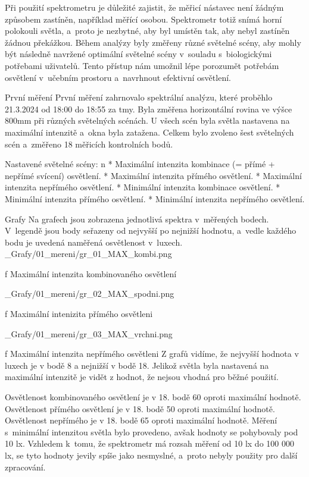 Při použití spektrometru je důležité zajistit, že měřicí nástavec není žádným způsobem zastíněn,
například měřící osobou. Spektrometr totiž snímá horní polokouli světla, a~proto je nezbytné, aby byl umístěn tak, aby nebyl zastíněn žádnou překážkou.
\medskip
Během analýzy byly změřeny různé světelné scény, aby mohly být následně navržené optimální světelné scény
v~souladu s~biologickými potřebami uživatelů. Tento přístup nám umožnil lépe porozumět potřebám osvětlení
v~učebním prostoru a~navrhnout efektivní osvětlení.%

\sec První měření
První měření zahrnovalo spektrální analýzu, které proběhlo 21.3.2024 od 18:00 do 18:55 za tmy. Byla změřena horizontální rovina ve výšce 800mm
při různých světelných scénách. U všech scén byla světla nastavena na maximální intenzitě a~okna byla zatažena.
Celkem bylo zvoleno šest světelných scén a~změřeno 18 měřicích kontrolních bodů.

\medskip\noindent
{\sbf Nastavené světelné scény:}
\begitems \style n
    * Maximální intenzita kombinace (= přímé + nepřímé svícení) osvětlení.
    * Maximální intenzita přímého osvětlení.
    * Maximální intenzita nepřímého osvětlení.
    * Minimální intenzita kombinace osvětlení.
    * Minimální intenzita přímého osvětlení.
    * Minimální intenzita nepřímého osvětlení.
\enditems

\secc Grafy
Na grafech jsou zobrazena jednotlivá spektra v~měřených bodech. V~legendě jsou body seřazeny od nejvyšší
po nejnižší hodnotu, a~vedle každého bodu je uvedená naměřená osvětlenost v~luxech.
\medskip {}
\picw=15cm _Grafy/01_mereni/gr_01_MAX_kombi.png
\caption/f Maximální intenzita kombinovaného osvětlení

\medskip {}
\picw=15cm _Grafy/01_mereni/gr_02_MAX_spodni.png
\caption/f Maximální intenizita přímého osvětleni

\medskip {}
\picw=15cm _Grafy/01_mereni/gr_03_MAX_vrchni.png
\caption/f Maximální intenzita nepřímého osvětleni
\medskip
Z grafů vidíme, že nejvyšší hodnota v luxech je v bodě 8 a nejnižší v bodě 18. Jelikož světla byla nastavená na maximální intenzitě
je vidět z hodnot, že nejsou vhodná pro běžné použití.

Osvětlenost kombinovaného osvětlení je v 18. bodě {60\pcent}  oproti maximální hodnotě.
Osvětlenost přímého osvětlení je v 18. bodě {50\pcent}  oproti maximální hodnotě.
Osvětlenost nepřímého je v 18. bodě {65\pcent}  oproti maximální hodnotě.
\medskip
Měření s~minimální intenzitou světla bylo provedeno, avšak hodnoty se pohybovaly pod 10 lx. Vzhledem k~tomu,
že spektrometr má rozsah měření od 10 lx do 100 000 lx, se tyto hodnoty jevily spíše jako nesmyslné, a~proto
nebyly použity pro další zpracování.

